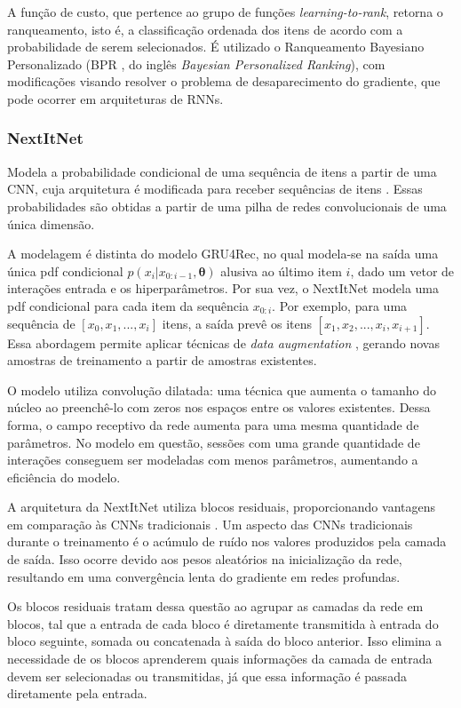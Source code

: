 A função de custo, que pertence ao grupo de funções \textit{learning-to-rank},
retorna o ranqueamento, isto é, a classificação ordenada dos itens de acordo com
a probabilidade de serem selecionados. É utilizado o Ranqueamento Bayesiano
Personalizado (BPR \cite{rendle2009}, do inglês \textit{Bayesian Personalized
Ranking}), com modificações visando resolver o problema de desaparecimento do
gradiente, que pode ocorrer em arquiteturas de RNNs.

\subsubsection{NextItNet}
Modela a probabilidade condicional de uma sequência de itens a partir de uma
CNN, cuja arquitetura é modificada para receber sequências de itens
\cite{nextitnet}. Essas probabilidades são obtidas a partir de uma pilha de
redes convolucionais de uma única dimensão.

A modelagem é distinta do modelo GRU4Rec, no qual modela-se na saída uma única
pdf condicional $p(x_i|x_{0:i-1}, \mathbf{\theta})$ alusiva ao último item $i$,
dado um vetor de interações entrada e os hiperparâmetros. Por sua vez, o
NextItNet modela uma pdf condicional para cada item da sequência $x_{0:i}$. Por
exemplo, para uma sequência de $[x_0, x_1, ..., x_i]$ itens, a saída prevê os
itens $[x_1, x_2, ..., x_i, x_{i+1}]$. Essa abordagem permite aplicar técnicas
de \textit{data augmentation} \cite{tan2016improved}, gerando novas amostras de
treinamento a partir de amostras existentes.

O modelo utiliza convolução dilatada: uma técnica que aumenta o tamanho do
núcleo ao preenchê-lo com zeros nos espaços entre os valores existentes. Dessa
forma, o campo receptivo da rede aumenta para uma mesma quantidade de
parâmetros. No modelo em questão, sessões com uma grande quantidade de
interações conseguem ser modeladas com menos parâmetros, aumentando a eficiência
do modelo.

A arquitetura da NextItNet utiliza blocos residuais, proporcionando vantagens em
comparação às CNNs tradicionais \cite{he2016deep}. Um aspecto das CNNs
tradicionais durante o treinamento é o acúmulo de ruído nos valores produzidos
pela camada de saída. Isso ocorre devido aos pesos aleatórios na inicialização
da rede, resultando em uma convergência lenta do gradiente em redes profundas.

Os blocos residuais tratam dessa questão ao agrupar as camadas da rede em
blocos, tal que a entrada de cada bloco é diretamente transmitida à entrada do
bloco seguinte, somada ou concatenada à saída do bloco anterior. Isso elimina a
necessidade de os blocos aprenderem quais informações da camada de entrada devem
ser selecionadas ou transmitidas, já que essa informação é passada diretamente
pela entrada.

